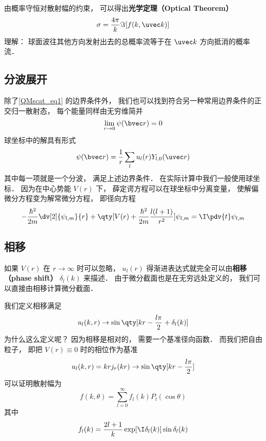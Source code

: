 由概率守恒对散射幅的约束， 可以得出\textbf{光学定理（Optical Theorem）}
\begin{equation}
\sigma = \frac{4\pi}{k} \Im[f(k, \uvec k)]
\end{equation}
理解： 球面波往其他方向发射出去的总概率流等于在 $\uvec k$ 方向抵消的概率流．

\subsection{分波展开}
除了\autoref{QMscat_eq1} 的边界条件外， 我们也可以找到符合另一种常用边界条件的正交归一散射态， 每个能量同样由无穷维简并
\begin{equation}
\lim_{r\to 0} \psi(\bvec r) = 0
\end{equation}
球坐标中的解具有形式
\begin{equation}
\psi(\bvec r) = \frac{1}{r} \sum_l u_l(r) Y_{l,0}(\uvec r)
\end{equation}
其中每一项就是一个分波， 满足上述边界条件． 在实际计算中我们一般使用球坐标． 因为在中心势能 $V(r)$ 下， 薛定谔方程可以在球坐标中分离变量， 使解偏微分方程变为解常微分方程， 即径向方程
\begin{equation}
-\frac{\hbar^2}{2m} \dv[2]{\psi_{l,m}}{r} + \qty[V(r) + \frac{\hbar^2}{2m}\frac{l(l + 1)}{r^2}]\psi_{l,m} = \I \pdv{t} \psi_{l,m}
\end{equation}

\subsection{相移}
如果 $V(r)$ 在 $r\to\infty$ 时可以忽略， $u_l(r)$ 得渐进表达式就完全可以由\textbf{相移（phase shift）} $\delta_l(k)$ 来描述． 由于微分截面也是在无穷远处定义的， 我们可以直接由相移计算微分截面．

我们定义相移满足
\begin{equation}
u_l(k, r) \to \sin\qty[kr - \frac{l\pi}{2} + \delta_l(k)]
\end{equation}
为什么这么定义呢？ 因为相移是相对的， 需要一个基准径向函数． 而我们把自由粒子， 即把 $V(r) \equiv 0$ 时的相位作为基准
\begin{equation}
u_l(k, r) = kr j_r(kr) \to \sin\qty[kr - \frac{l\pi}{2}]
\end{equation}
可以证明散射幅为
\begin{equation}
f(k, \theta) = \sum_{l=0}^\infty f_l(k) P_l(\cos\theta)
\end{equation}
其中
\begin{equation}
f_l(k) = \frac{2l+1}{k} \exp[\I\delta_l(k)] \sin\delta_l (k)
\end{equation}


